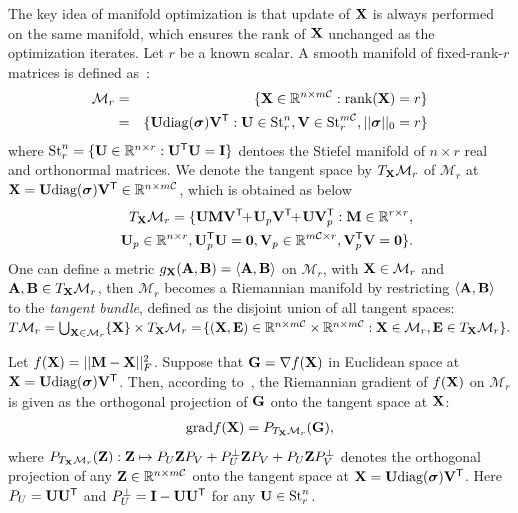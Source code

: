\documentclass[letterpaper]{article}
\def\M{\mathcal{M}}
\def\R{{\mathbb R}}
\def\U{{\bf U}}
\def\V{{\bf V}}
\def\diag{\mbox{diag}}
\def\bsigma{\mbox{{\boldmath $\sigma$}}}
\def\trsp{{\sf T}}
\def\I{{\bf I}}
\def\0{{\bf 0}}
\def\E{{\bf E}}
\def\G{{\bf G}}
\def\grad{{\text{grad}}}
\def\bZ{{\bf Z}}
\def\bA{{\bf A}}
\def\bB{{\bf B}}
\def\bM{{\bf M}}
\def\calC{{\mathcal{C}}}
\def\bX{{\bf X}}
\def\bA{{\bf A}}
\def\bX{{\bf X}}
\def\rank{{\text{rank}}}
\begin{document}
The key idea of manifold optimization is that update of $\bX$ is always performed on the same manifold, which ensures the rank of $\bX$ unchanged as the optimization iterates.
Let $r$ be a known scalar.
A smooth manifold of fixed-rank-$r$ matrices is defined as~\cite{vandereycken2013lowrank}:
\begin{eqnarray}
\M_{r} &=& \{\bX\in \R^{n\times m\calC}: \rank(\bX) = r\} \nonumber \\
       &=& \{\U\diag(\bsigma)\V^{\trsp}: \U \in \textrm{St}_{r}^{n}, \V \in
           \textrm{St}_{r}^{m\calC}, ||\bsigma||_0 = r\} \nonumber
\end{eqnarray}
\noindent
where $\textrm{St}_{r}^{n} = \{\U \in \R^{n\times r}:
\U^{\trsp}\U = \I \}$ dentoes the Stiefel manifold of $n\times r$ real and orthonormal matrices.
We denote the tangent space by $T_{\bX}\M_{r}$ of $\M_{r}$ at $\bX = \U\diag(\bsigma)\V^{\trsp} \in \R^{n \times m\calC}$,
which is obtained as below
\begin{eqnarray}\label{eq:tangent_vector}
&&T_{\bX}\M_{r} =  \{\U\bM\V^{\trsp} \!\!+\! \U_p\V^{\trsp} \!\!+\!
\U\V_p^{\trsp}: \bM \in \R^{r\times r}, \nonumber\\ && \U_p \in \R^{n\times r},
\U_p^{\trsp}\U = \0, \V_p \in \R^{m\calC \times r}, \V_p^{\trsp}\V = \0\}.
\end{eqnarray}
\noindent
One can define a metric $g_{\bX}({\bA},{\bB}) = \langle{\bA},{\bB}\rangle$ on $\M_{r}$,
with $\bX \in \M_{r}$ and ${\bA},{\bB} \in T_{\bX}\M_{r}$,
then $\M_{r}$ becomes a Riemannian manifold by restricting
$\langle\bA,\bB\rangle$
to the \emph{tangent bundle}, defined as the disjoint union of all tangent spaces:
$T\M_{r} = \bigcup_{\bX\in \M_{r}}\{\bX\} \times T_{\bX}\M_{r}
         = \! \{(\bX,\E)\in \R^{n \times m\calC} \times \R^{n \times m\calC}: \bX \in \M_{r}, \E \in T_{\bX}\M_{r}\}.$



Let $f(\bX) = || \bM - \bX ||_F^2$.
Suppose that $\G = \nabla f(\bX)$ in Euclidean space at $\bX = \U\diag(\bsigma)\V^{\trsp}$.
Then, according to~\cite{vandereycken2013lowrank}, the Riemannian gradient of $f(\bX)$ on $\M_r$ is given as the orthogonal
projection of $\G$ onto the tangent space at $\bX$:
\begin{eqnarray}\label{eq:grad}
\grad{f(\bX)} = P_{T_{\bX}\M_{r}}(\G)  ,
\end{eqnarray}
\noindent
where
$P_{T_{\bX}\M_{r}}(\bZ): \bZ \mapsto P_{U}\bZ P_{V} + P_{U}^{\perp} \bZ P_{V} + P_{U} \bZ P_{V}^{\perp}$
denotes the orthogonal projection of any
$\bZ \in \R^{n \times m\calC}$ onto the tangent space at $\bX = \U\diag(\bsigma)\V^{\trsp}$.
Here $P_U = \U \U^{\trsp}$ and $P_U^{\perp} = \I - \U \U^{\trsp}$ for any $\U \in \textrm{St}_{r}^{n}$.
\end{document}
